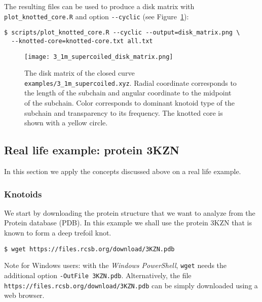 The resulting files can be used to produce a disk matrix\cite{rawdon} 
with \lstinline{plot_knotted_core.R} and option \lstinline{--cyclic} (see Figure~\ref{fig:3_1m_supercoiled:disk}):
\begin{lstlisting}
$ scripts/plot_knotted_core.R --cyclic --output=disk_matrix.png \
  --knotted-core=knotted-core.txt all.txt
\end{lstlisting}
\begin{figure}[t]
\centering
\texttt{[image: 3\_1m\_supercoiled\_disk\_matrix.png]}
\caption{ The disk matrix of the closed curve \lstinline{examples/3_1m_supercoiled.xyz}. Radial coordinate corresponds to the length of the subchain and angular coordinate to the midpoint of the subchain. Color corresponds to dominant knotoid type of the subchain and transparency to its frequency. The knotted core is shown with a yellow circle.}\label{fig:3_1m_supercoiled:disk}
\end{figure}



\clearpage
\subsection{\label{sec:example}Real life example: protein 3KZN}
In this section we apply the concepts discussed above on a real life example.
\subsubsection{Knotoids}
We start by downloading the protein structure that we want to analyze from the Protein database (PDB)\cite{pdb}. In this example we shall use the protein 3KZN\cite{shi2006} that is known to form a deep trefoil knot.
\begin{lstlisting}
$ wget https://files.rcsb.org/download/3KZN.pdb
\end{lstlisting}
Note for Windows users: with the {\it Windows PowerShell}, \lstinline{wget} needs the additional option \lstinline{-OutFile 3KZN.pdb}. Alternatively, the file \lstinline{https://files.rcsb.org/download/3KZN.pdb} can be simply downloaded using a web browser.

